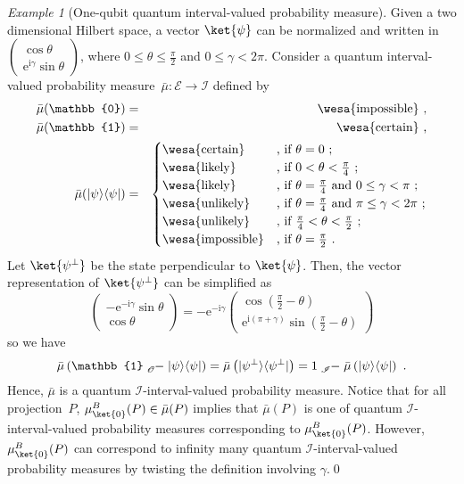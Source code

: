 \documentclass{article}
\theoremstyle{remark}
\newtheorem{example}{Example}
\newcommand{\events}{\ensuremath{\mathcal{E}}}
\newcommand{\proj}[1]{|#1 \rangle\langle #1 |}
\newcommand{\imposs}{{\mbox{\wesa{impossible}}}}
\newcommand{\likely}{{\mbox{\wesa{likely}}}}
\newcommand{\unlikely}{{\mbox{\wesa{unlikely}}}}
\newcommand{\necess}{{\mbox{\wesa{certain}}}}
\newcommand{\rme}{\mathrm{e}}
\newcommand{\rmi}{\mathrm{i}}
\begin{document}
\begin{example}[One-qubit quantum interval-valued probability measure]\label{ex:One-qubit-quantum-interval}
Given a two dimensional Hilbert space, a vector $\ket{\psi}$ can
be normalized and written in $\left(\begin{array}{c}
\cos\theta\\
\rme^{\rmi\gamma}\sin\theta
\end{array}\right)$, where $0\le\theta\le\frac{\pi}{2}$ and $0\le\gamma<2\pi$. Consider
a quantum interval-valued probability measure~$\bar{\mu}:\events\rightarrow\mathscr{I}$
defined by 
\begin{eqnarray*}
\bar{\mu}(\mathbb{0}) & = & \imposs\textrm{ ,}\\
\bar{\mu}(\mathbb{1}) & = & \necess\textrm{ ,}\\
\bar{\mu}(\proj{\psi}) & = & \begin{cases}
\necess & \textrm{, if }\theta=0\textrm{ ;}\\
\likely & \textrm{, if }0<\theta<\frac{\pi}{4}\textrm{ ;}\\
\likely & \textrm{, if }\theta=\frac{\pi}{4}\textrm{ and }0\le\gamma<\pi\textrm{ ;}\\
\unlikely & \textrm{, if }\theta=\frac{\pi}{4}\textrm{ and }\pi\le\gamma<2\pi\textrm{ ;}\\
\unlikely & \textrm{, if }\frac{\pi}{4}<\theta<\frac{\pi}{2}\textrm{ ;}\\
\imposs & \textrm{, if }\theta=\frac{\pi}{2}\textrm{ .}
\end{cases}
\end{eqnarray*}
Let $\ket{\psi^{\perp}}$ be the state perpendicular to $\ket{\psi}$.
Then, the vector representation of $\ket{\psi^{\perp}}$ can be simplified
as 
\[
\left(\begin{array}{c}
-\rme^{-\rmi\gamma}\sin\theta\\
\cos\theta
\end{array}\right)=-\rme^{-\rmi\gamma}\left(\begin{array}{c}
\cos\left(\frac{\pi}{2}-\theta\right)\\
\rme^{\rmi\left(\pi+\gamma\right)}\sin\left(\frac{\pi}{2}-\theta\right)
\end{array}\right)
\]
so we have 
\[
\bar{\mu}\left(\mathbb{1}\tensor*[_{\mathscr{O}}]{-}{}\proj{\psi}\right)=\bar{\mu}\left(\proj{\psi^{\perp}}\right)=1\tensor*[_{\mathscr{I}}]{-}{}\bar{\mu}\left(\proj{\psi}\right)\textrm{ .}
\]
Hence, $\bar{\mu}$ is a quantum $\mathscr{I}$-interval-valued probability
measure. Notice that for all projection~$P$, $\mu_{\ket{0}}^{B}(P)\in\bar{\mu}(P)$
implies that $\bar{\mu}(P)$ is one of quantum $\mathscr{I}$-interval-valued
probability measures corresponding to $\mu_{\ket{0}}^{B}(P)$. However,
$\mu_{\ket{0}}^{B}(P)$ can correspond to infinity many quantum $\mathscr{I}$-interval-valued
probability measures by twisting the definition involving $\gamma$.\qed\end{example}
\end{document}
